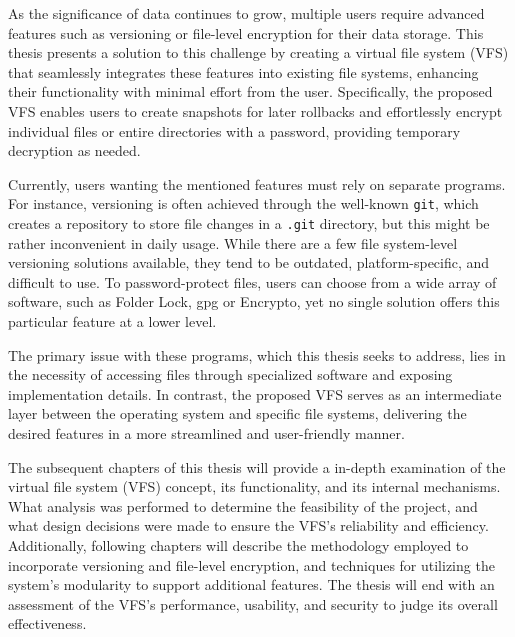 

As the significance of data continues to grow, multiple users require advanced features such as versioning or file-level encryption for their data storage.
This thesis presents a solution to this challenge by creating a virtual file system (VFS) that seamlessly integrates these features into existing file systems, enhancing their functionality with minimal effort from the user.
Specifically, the proposed VFS enables users to create snapshots for later rollbacks and effortlessly encrypt individual files or entire directories with a password, providing temporary decryption as needed.

Currently, users wanting the mentioned features must rely on separate programs.
For instance, versioning is often achieved through the well-known \texttt{git}, which creates a repository to store file changes in a \texttt{.git} directory, but this might be rather inconvenient in daily usage.
While there are a few file system-level versioning solutions available, they tend to be outdated, platform-specific, and difficult to use.
To password-protect files, users can choose from a wide array of software, such as Folder Lock, gpg or Encrypto, yet no single solution offers this particular feature at a lower level.

The primary issue with these programs, which this thesis seeks to address, lies in the necessity of accessing files through specialized software and exposing implementation details.
In contrast, the proposed VFS serves as an intermediate layer between the operating system and specific file systems, delivering the desired features in a more streamlined and user-friendly manner.

The subsequent chapters of this thesis will provide a in-depth examination of the virtual file system (VFS) concept, its functionality, and its internal mechanisms.
What analysis was performed to determine the feasibility of the project, and what design decisions were made to ensure the VFS's reliability and efficiency.
Additionally, following chapters will describe the methodology employed to incorporate versioning and file-level encryption, and techniques for utilizing the system's modularity to support additional features.
The thesis will end with an assessment of the VFS's performance, usability, and security to judge its overall effectiveness.